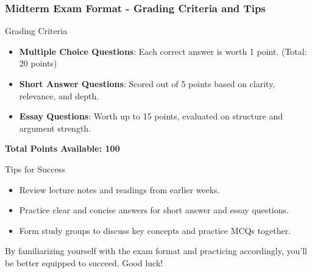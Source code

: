 \documentclass[aspectratio=169]{beamer}
\begin{document}
\begin{frame}[fragile]
    \frametitle{Midterm Exam Format - Grading Criteria and Tips}
    \begin{block}{Grading Criteria}
        \begin{itemize}
            \item \textbf{Multiple Choice Questions}: Each correct answer is worth 1 point. (Total: 20 points)
            \item \textbf{Short Answer Questions}: Scored out of 5 points based on clarity, relevance, and depth.
            \item \textbf{Essay Questions}: Worth up to 15 points, evaluated on structure and argument strength.
        \end{itemize}
        \textbf{Total Points Available: 100}
    \end{block}
    
    \begin{block}{Tips for Success}
        \begin{itemize}
            \item Review lecture notes and readings from earlier weeks.
            \item Practice clear and concise answers for short answer and essay questions.
            \item Form study groups to discuss key concepts and practice MCQs together.
        \end{itemize}
        By familiarizing yourself with the exam format and practicing accordingly, you'll be better equipped to succeed. Good luck!
    \end{block}
\end{frame}
\end{document}
